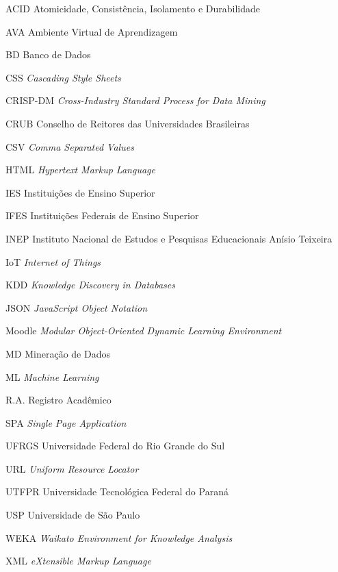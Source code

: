 
\begin{siglas}
    \item[ACID] Atomicidade, Consistência, Isolamento e Durabilidade
    \item[AVA] Ambiente Virtual de Aprendizagem
    \item[BD] Banco de Dados
    \item[CSS] \textit{Cascading Style Sheets}
    \item[CRISP-DM] \textit{Cross-Industry Standard Process for Data Mining}
    \item[CRUB] Conselho de Reitores das Universidades Brasileiras
    \item[CSV] \textit{Comma Separated Values}
    \item[HTML] \textit{Hypertext Markup Language}
    \item[IES] Instituições de Ensino Superior
    \item[IFES] Instituições Federais de Ensino Superior
    \item[INEP] Instituto Nacional de Estudos e Pesquisas Educacionais Anísio Teixeira
    \item[IoT] \textit{Internet of Things}
    \item[KDD] \textit{Knowledge Discovery in Databases}
    \item[JSON] \textit{JavaScript Object Notation}
    \item[Moodle] \textit{Modular Object-Oriented Dynamic Learning Environment}
    \item[MD]   Mineração de Dados
    \item[ML]   \textit{Machine Learning}
    \item[R.A.] Registro Acadêmico
    \item[SPA] \textit{Single Page Application}
    \item[UFRGS] Universidade Federal do Rio Grande do Sul
    \item[URL] \textit{Uniform Resource Locator}
    \item[UTFPR] Universidade Tecnológica Federal do Paraná
    \item[USP] Universidade de São Paulo
    \item[WEKA] \textit{Waikato Environment for Knowledge Analysis}
    \item[XML] \textit{eXtensible Markup Language}
\end{siglas}

